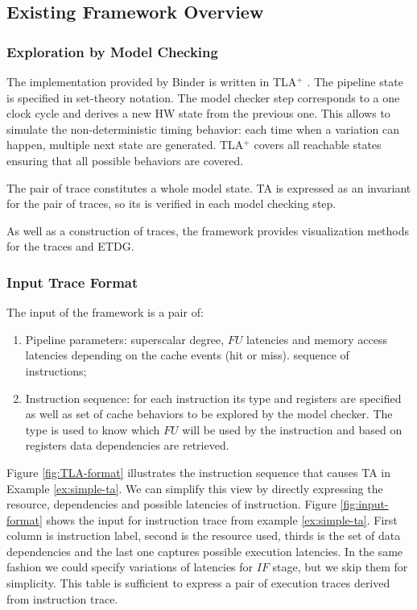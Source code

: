 \subsection{Existing Framework Overview}

\subsubsection{Exploration by Model Checking}

The implementation provided by Binder is written in TLA$^+$ \cite{lamport_specifying_2003}. The pipeline state is specified in set-theory notation. The model checker step corresponds to a one clock cycle and derives a new HW state from the previous one. This allows to simulate the non-deterministic timing behavior: each time when a variation can happen, multiple next state are generated. TLA$^+$ covers all reachable states ensuring that all possible behaviors are covered.

The pair of trace constitutes a whole model state. TA is expressed as an invariant for the pair of traces, so its is verified in each model checking step. 

As well as a construction of traces, the framework provides visualization methods for the traces and ETDG.


\subsubsection{Input Trace Format}

The input of the framework is a pair of:
\begin{enumerate}
	\item Pipeline parameters: superscalar degree, $FU$ latencies and memory access latencies depending on the cache events (hit or miss). sequence of instructions;
	\item Instruction sequence: for each instruction its type and registers are specified as well as set of cache behaviors to be explored by the model checker. The type is used to know which $FU$ will be used by the instruction and based on registers data dependencies are retrieved.
\end{enumerate}

Figure \ref{fig:TLA-format} illustrates the instruction sequence that causes TA in Example \ref{ex:simple-ta}. We can simplify this view by directly expressing the resource, dependencies and possible latencies of instruction. Figure \ref{fig:input-format} shows the input for instruction trace from example \ref{ex:simple-ta}. First column is instruction label, second is the resource used, thirds is the set of data dependencies and the last one captures possible execution latencies. In the same fashion we could specify variations of latencies for $IF$ stage, but we skip them for simplicity. This table is sufficient to express a pair of execution traces derived from instruction trace.

